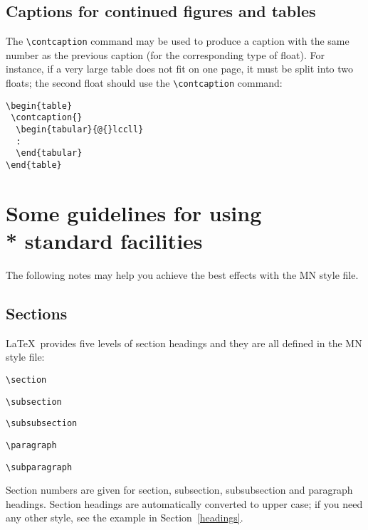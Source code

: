 \subsection{Captions for continued figures and tables}\label{contfigtab}

The \verb"\contcaption" command may be used to produce a caption with the
same number as the previous caption (for the corresponding type of
float). For instance, if a very large table does not fit on one page,
it must be split into two floats; the second float should use the
\verb"\contcaption" command:
%
\begin{verbatim}
\begin{table}
 \contcaption{}
  \begin{tabular}{@{}lccll}
  :
  \end{tabular}
\end{table}
\end{verbatim}


\section[]{Some guidelines for using\\* standard facilities}

The following notes may help you achieve the best effects with the MN
style file.

\subsection{Sections}

\LaTeX\ provides five levels of section headings and they are all
defined in the MN style file:
\begin{description}
  \item \verb"\section"
  \item \verb"\subsection"
  \item \verb"\subsubsection"
  \item \verb"\paragraph"
  \item \verb"\subparagraph"
\end{description}
Section numbers are given for section, subsection, subsubsection
and paragraph headings.  Section headings are automatically converted to
upper case; if you need any other style, see the example in Section~\ref{headings}.

